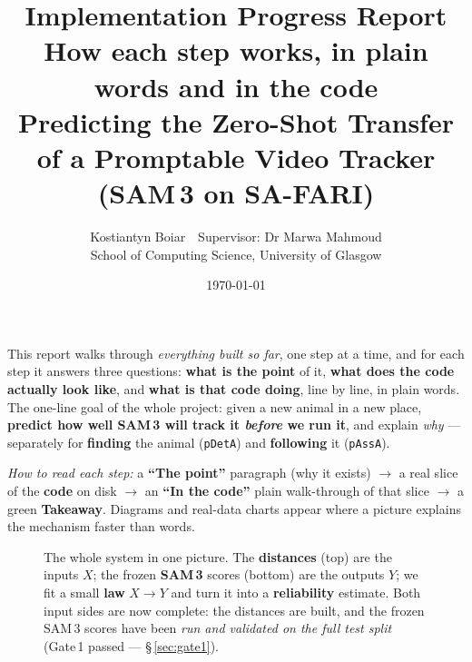 \documentclass[11pt,a4paper]{article}
\title{\vspace{-1.6em}\textbf{Implementation Progress Report}\\[3pt]
\large How each step works, in plain words and in the code\\[1pt]
\normalsize Predicting the Zero-Shot Transfer of a Promptable Video Tracker (SAM\,3 on SA-FARI)}
\author{Kostiantyn Boiar \,\textbullet\, Supervisor: Dr Marwa Mahmoud\\
\normalsize School of Computing Science, University of Glasgow}
\date{\today}
\newcommand{\code}[1]{\texttt{#1}}
\begin{document}
\maketitle
\vspace{-1.0em}

\noindent
This report walks through \emph{everything built so far}, one step at a time, and for each step it answers
three questions: \textbf{what is the point} of it, \textbf{what does the code actually look like}, and
\textbf{what is that code doing}, line by line, in plain words. The one-line goal of the whole project:
given a new animal in a new place, \textbf{predict how well SAM\,3 will track it \emph{before} we run it},
and explain \emph{why} --- separately for \textbf{finding} the animal (\code{pDetA}) and \textbf{following}
it (\code{pAssA}).

\smallskip\noindent
\textit{How to read each step:} a \textbf{``The point''} paragraph (why it exists) $\rightarrow$ a real
slice of the \textbf{code} on disk $\rightarrow$ an \textbf{``In the code''} plain walk-through of that
slice $\rightarrow$ a green \textbf{Takeaway}. Diagrams and real-data charts appear where a picture explains
the mechanism faster than words.

\begin{figure}[h]
\centering
{}
\caption{The whole system in one picture. The \textbf{distances} (top) are the inputs $X$; the frozen
\textbf{SAM\,3} scores (bottom) are the outputs $Y$; we fit a small \textbf{law} $X\!\to\!Y$ and turn it into
a \textbf{reliability} estimate. Both input sides are now complete: the distances are built, and the frozen
SAM\,3 scores have been \emph{run and validated on the full test split} (Gate\,1 passed --- \S\,\ref{sec:gate1}).}
\end{figure}
\end{document}
